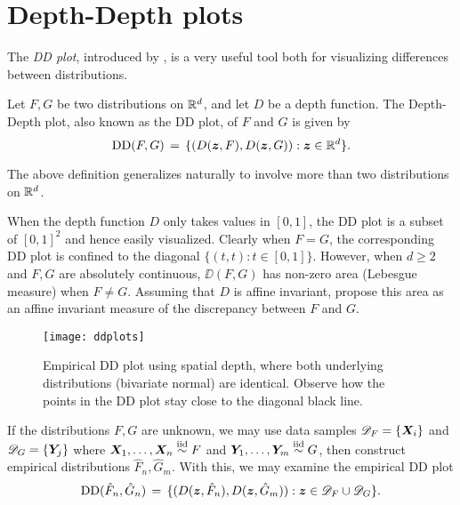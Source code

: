 \section{Depth-Depth plots}
\label{sec:multivariate_ddplots}

The \emph{DD plot}, introduced by \textcite{liu-parelius-singh-1999}, is a
very useful tool both for visualizing differences between distributions.

\begin{definition}[DD plot] \label{def:ddplot}
    Let $F, G$ be two distributions on $\mathbb{R}^d$, and let $D$ be a depth
    function. The Depth-Depth plot, also known as the DD plot, of $F$ and $G$
    is given by
    \begin{equation}
        \operatorname{DD}(F, G) \,=\, \{(D(\bm{z}, F), D(\bm{z}, G)) : \bm{z} \in \mathbb{R}^d\}.
    \end{equation}
\end{definition}
\begin{remark}
    The above definition generalizes naturally to involve more than two
    distributions on $\mathbb{R}^d$.
\end{remark}

When the depth function $D$ only takes values in $[0, 1]$, the DD plot is a
subset of $[0, 1]^2$ and hence easily visualized.
Clearly when $F = G$, the corresponding DD plot is confined to the diagonal
$\{(t, t) : t \in [0, 1]\}$.
However, when $d \geq 2$ and $F, G$ are absolutely continuous, $\DD(F, G)$ has
non-zero area (Lebesgue measure) when $F \neq G$.
Assuming that $D$ is affine invariant, \textcite{liu-parelius-singh-1999}
propose this area as an affine invariant measure of the discrepancy between
$F$ and $G$.



\begin{figure}
    \centering
    \texttt{[image: ddplots]}
    \caption{
        Empirical DD plot using spatial depth, where both underlying
        distributions (bivariate normal) are identical.
        Observe how the points in the DD plot stay close to the diagonal black
        line.
    }
    \label{fig:ddplots_identical}
\end{figure}



If the distributions $F, G$ are unknown, we may use data samples
$\mathscr{D}_F = \{\bm{X}_i\}$ and $\mathscr{D}_G = \{\bm{Y}_j\}$ where $\bm{X}_1,
\dots, \bm{X}_n \overset{\text{iid}}{\sim} F$ and $\bm{Y}_1, \dots, \bm{Y}_m \overset{\text{iid}}{\sim} G$, then construct
empirical distributions $\hat{F}_n, \hat{G}_m$.
With this, we may examine the empirical DD plot
\begin{equation}
    \operatorname{DD}(\hat{F}_n, \hat{G}_n) \,=\, \{(D(\bm{z}, \hat{F}_n), D(\bm{z}, \hat{G}_m)) : \bm{z} \in \mathscr{D}_F \cup \mathscr{D}_G\}.
\end{equation}

